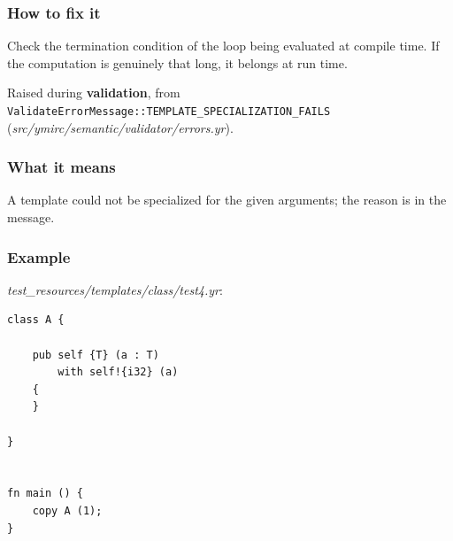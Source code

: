 \subsubsection*{How to fix it}

Check the termination condition of the loop being evaluated at compile time. If the computation is genuinely that long, it belongs at run time.

\label{sec:codes:e4202}

Raised during \textbf{validation}, from \texttt{ValidateErrorMessage::\allowbreak{}TEMPLATE\_\allowbreak{}SPECIALIZATION\_\allowbreak{}FAILS} (\textit{src/\allowbreak{}ymirc/\allowbreak{}semantic/\allowbreak{}validator/\allowbreak{}errors.yr}).

\subsubsection*{What it means}

A template could not be specialized for the given arguments; the reason is in the message.

\subsubsection*{Example}

\textit{test\_\allowbreak{}resources/\allowbreak{}templates/\allowbreak{}class/\allowbreak{}test4.yr}:

\begin{lstlisting}[style=coloredverbatimError]
class A {

    pub self {T} (a : T)
        with self!{i32} (a)
    {
    }

}


fn main () {
    copy A (1);
}
\end{lstlisting}

